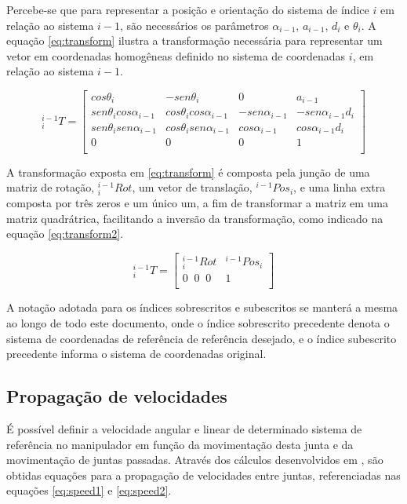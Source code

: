 Percebe-se que para representar a posição e orientação do sistema de 
índice $i$ em relação ao sistema $i-1$, são necessários os parâmetros 
$\alpha_{i-1}$, $a_{i-1}$, $d_i$ e $\theta_i$. 
A equação \ref{eq:transform} ilustra a transformação necessária
para representar um vetor em coordenadas homogêneas definido no 
sistema de coordenadas $i$, em relação ao sistema $i-1$.

\begin{equation}
    \label{eq:transform}
    ^{i-1}_iT = 
    \begin{bmatrix}
        cos\theta_i                 & -sen\theta_i                  & 0                 & a_{i-1}               \\
        sen\theta_icos\alpha_{i-1}  & cos\theta_icos\alpha_{i-1}    & -sen\alpha_{i-1}  & -sen\alpha_{i-1}d_i   \\
        sen\theta_isen\alpha_{i-1}  & cos\theta_isen\alpha_{i-1}    & cos\alpha_{i-1}   & cos\alpha_{i-1}d_i    \\
           0                        &    0                          &    0              &  1                    \\    
    \end{bmatrix}
\end{equation}

A transformação exposta em \ref{eq:transform} é composta pela junção
de uma matriz de rotação, $^{i-1}_iRot$, um vetor de translação, $^{i-1}Pos_i$,
e uma linha extra composta por três zeros e um único um,
a fim de transformar a matriz em uma matriz quadrátrica, facilitando
a inversão da transformação, como indicado na equação \ref{eq:transform2}. 

\begin{equation}
    \label{eq:transform2}
    ^{i-1}_iT = 
    \begin{bmatrix}
        ^{i-1}_iRot & ^{i-1}Pos_i   \\
        0 \;\; 0 \;\; 0       & 1   \\
    \end{bmatrix}
\end{equation}

A notação adotada para os índices 
sobrescritos e subescritos se manterá a mesma ao longo de todo este
documento, onde o índice sobrescrito precedente denota o sistema de 
coordenadas de referência de referência desejado, e o índice subescrito 
precedente informa o sistema de coordenadas original.

\subsection{Propagação de velocidades}
É possível definir a velocidade angular e linear de determinado 
sistema de referência no manipulador em função da movimentação desta
junta e da movimentação de juntas passadas. Através dos cálculos 
desenvolvidos em \cite{craig2009introduction}, são obtidas 
equações para a propagação de velocidades entre juntas, referenciadas
nas equações \ref{eq:speed1} e \ref{eq:speed2}.

